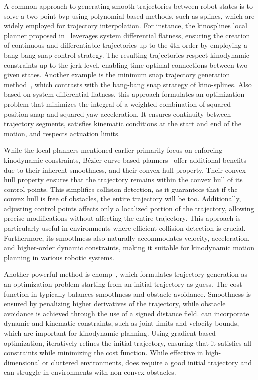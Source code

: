 A common approach to generating smooth trajectories between robot states is to solve a two-point \gls{bvp} using polynomial-based methods, such as splines, which are widely employed for trajectory interpolation. 
For instance, the kinosplines local planner proposed in~\cite{cKino} leverages system differential flatness, ensuring the creation of continuous and differentiable trajectories up to the 4th order by employing a bang-bang snap control strategy. 
The resulting trajectories respect kinodynamic constraints up to the jerk level, enabling time-optimal connections between two given states. 
Another example is the minimum snap trajectory generation method~\cite{cMinimumSnap}, which contrasts with the bang-bang snap strategy of kino-splines. 
Also based on system differential flatness, this approach formulates an optimization problem that minimizes the integral of a weighted combination of squared position snap and squared yaw acceleration.
It ensures continuity between trajectory segments, satisfies kinematic conditions at the start and end of the motion, and respects actuation limits.

While the local planners mentioned earlier primarily focus on enforcing kinodynamic constraints, Bézier curve-based planners~\cite{cBezier,cBezier2} offer additional benefits due to their inherent smoothness, and their convex hull property.
Their convex hull property ensures that the trajectory remains within the convex hull of its control points. 
This simplifies collision detection, as it guarantees that if the convex hull is free of obstacles, the entire trajectory will be too. 
Additionally, adjusting control points affects only a localized portion of the trajectory, allowing precise modifications without affecting the entire trajectory. 
This approach is particularly useful in environments where efficient collision detection is crucial.
Furthermore, its smoothness also naturally accommodates velocity, acceleration, and higher-order dynamic constraints, making it suitable for kinodynamic motion planning in various robotic systems. 

Another powerful method is \gls{chomp}~\cite{cCHOMP}, which formulates trajectory generation as an optimization problem starting from an initial trajectory as guess. 
The cost function in  typically balances smoothness and obstacle avoidance.
Smoothness is ensured by penalizing higher derivatives of the trajectory, while obstacle avoidance is achieved through the use of a signed distance field. 
 can incorporate dynamic and kinematic constraints, such as joint limits and velocity bounds, which are important for kinodynamic planning. 
Using gradient-based optimization,  iteratively refines the initial trajectory, ensuring that it satisfies all constraints while minimizing the cost function. 
While effective in high-dimensional or cluttered environments,  does require a good initial trajectory and can struggle in environments with non-convex obstacles.

